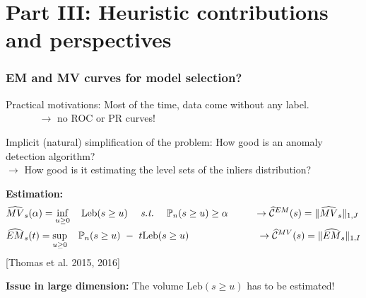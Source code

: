 \documentclass[9pt]{beamer}
\newcommand{\st}{\text{\emph{s.t.}}{}}
\newcommand{\crit}{\mathcal{C}}
\def\leb{\text{Leb}}
\begin{document}
\section{Part III: Heuristic contributions and perspectives}


\begin{frame}
\frametitle{EM and MV curves for model selection?}





\begin{block}{Practical motivations:}
Most of the time, data come without any label.\\
{\footnotesize ~~~~~~ $\to$ no ROC or PR curves!}
\end{block}

\begin{block}{Implicit (natural) simplification of the problem:}
How good is an anomaly detection algorithm?\\
$\to$ How good is it estimating the level sets of the inliers distribution?
\end{block}


\textbf{Estimation:}
\small{
\begin{align*}
&\widehat{MV}_s(\alpha) = \inf_{u \ge 0} ~~~\leb(s \ge u) ~~~~\st~~~~ \mathbb{P}_n(s \ge u) \ge \alpha ~~~~~~~~\to \widehat{\crit}^{EM}(s) = \|\widehat{MV}_s\|_{1, J}\\
&\widehat{EM}_s(t) = \sup_{u \ge 0} ~~~\mathbb{P}_n(s \ge u) ~-~ t \leb(s \ge u) ~~~~~~~~~~~~~~~~~~~~~\to \widehat{\crit}^{MV}(s) = \|\widehat{EM}_s\|_{1, I}
\end{align*}
}
[Thomas et al. 2015, 2016]


\textbf{Issue in large dimension:}
\small{
The volume $\leb(s \ge u)$ has to be estimated! %
}

\end{frame}
\end{document}
